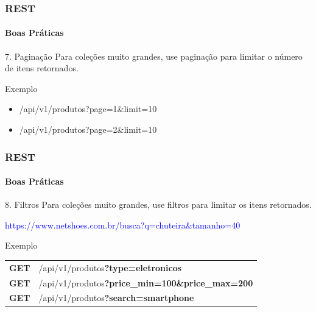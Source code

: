 \documentclass[
	9pt, %
	t, %
]{beamer}
\newcommand{\yellowbox}[1]{\colorbox{yellow!75}{#1}}
\begin{document}
\begin{frame}
	\frametitle{REST}
	\framesubtitle{Boas Práticas}

	\begin{block}{7. Paginação}
		Para coleções muito grandes, use paginação para limitar o número de itens retornados.
	\end{block}

	\begin{exampleblock}{Exemplo}
		\begin{itemize}
			\item /api/v1/produtos\yellowbox{?page=1\&limit=10}
			\item /api/v1/produtos\yellowbox{?page=2\&limit=10}
		\end{itemize}
	\end{exampleblock}

\end{frame}

\begin{frame}
	\frametitle{REST}
	\framesubtitle{Boas Práticas}

	\begin{block}{8. Filtros}
		Para coleções muito grandes, use filtros para limitar os itens retornados. \\ \bigskip

		\textcolor{blue}{https://www.netshoes.com.br\yellowbox{/busca?q=chuteira\&tamanho=40}}
	\end{block}

	\begin{exampleblock}{Exemplo}
		\begin{tabular}{@{}ll@{}}
			\textbf{GET} & \yellowbox{/api/v1/produtos\textbf{?type=eletronicos}}               \\
			\textbf{GET} & \yellowbox{/api/v1/produtos\textbf{?price\_min=100\&price\_max=200}} \\
			\textbf{GET} & \yellowbox{/api/v1/produtos\textbf{?search=smartphone}}              \\
		\end{tabular}
	\end{exampleblock}

\end{frame}
\end{document}

